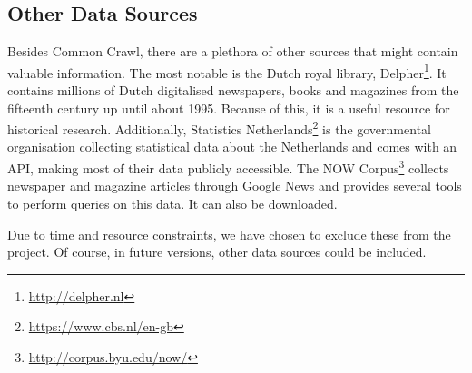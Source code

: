 \subsection{Other Data Sources} \label{sec:delpher}
Besides Common Crawl, there are a plethora of other sources that might contain valuable information. The most notable is the Dutch royal library, Delpher\footnote{\url{http://delpher.nl}}. It contains millions of Dutch digitalised newspapers, books and magazines from the fifteenth century up until about 1995. Because of this, it is a useful resource for historical research. Additionally, Statistics Netherlands\footnote{\url{https://www.cbs.nl/en-gb}} is the governmental organisation collecting statistical data about the Netherlands and comes with an API, making most of their data publicly accessible. The NOW Corpus\footnote{\url{http://corpus.byu.edu/now/}} collects newspaper and magazine articles through Google News and provides several tools to perform queries on this data. It can also be downloaded. 

Due to time and resource constraints, we have chosen to exclude these from the project. Of course, in future versions, other data sources could be included.